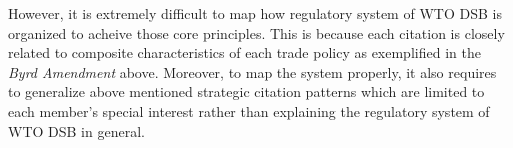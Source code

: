 However, it is extremely difficult to 
map how regulatory system of 
WTO DSB is organized to acheive 
those core principles. 
This is because each citation is closely related 
to composite characteristics 
of each trade policy as exemplified in 
the \textit{Byrd Amendment} above. 
Moreover, to map the system properly, 
it also requires to generalize above mentioned strategic 
citation patterns which are limited 
to each member's special interest 
rather than explaining the 
regulatory system of WTO DSB in general.

